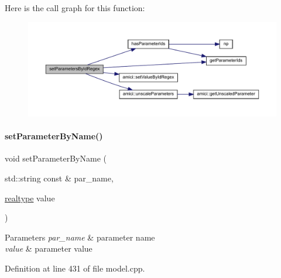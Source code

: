 Here is the call graph for this function\+:
\nopagebreak
\begin{figure}[H]
\begin{center}
\leavevmode
\includegraphics[width=350pt]{classamici_1_1_model_ab66d6b754637ed68449af96f5887a0be_cgraph}
\end{center}
\end{figure}
\mbox{\label{classamici_1_1_model_a6c5ceb2ba684cf68a7f21ad865091200}} 
\paragraph{\texorpdfstring{set\+Parameter\+By\+Name()}{setParameterByName()}}
{\footnotesize\ttfamily void set\+Parameter\+By\+Name (\begin{DoxyParamCaption}\item[{std\+::string const \&}]{par\+\_\+name,  }\item[{\mbox{\hyperlink{namespaceamici_a1bdce28051d6a53868f7ccbf5f2c14a3}{realtype}}}]{value }\end{DoxyParamCaption})}


\begin{DoxyParams}{Parameters}
{\em par\+\_\+name} & parameter name \\
\hline
{\em value} & parameter value \\
\hline
\end{DoxyParams}


Definition at line 431 of file model.\+cpp.

